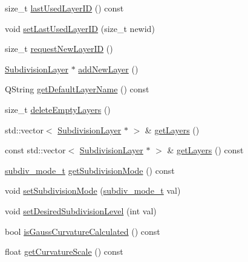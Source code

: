 \begin{DoxyCompactItemize}
\item 
size\+\_\+t \hyperlink{classShipCAD_1_1SubdivisionSurface_ac1efd2774e8a7e646468154ed5480f94}{last\+Used\+Layer\+ID} () const 
\item 
void \hyperlink{classShipCAD_1_1SubdivisionSurface_aa72a8cf7c5bddaaf24ec41ad3480fe70}{set\+Last\+Used\+Layer\+ID} (size\+\_\+t newid)
\item 
size\+\_\+t \hyperlink{classShipCAD_1_1SubdivisionSurface_a3af3a30b53d867b2b25f9ac9290a264a}{request\+New\+Layer\+ID} ()
\item 
\hyperlink{classShipCAD_1_1SubdivisionLayer}{Subdivision\+Layer} $\ast$ \hyperlink{classShipCAD_1_1SubdivisionSurface_a5bf8f452664e17dae636d4b66a66eba9}{add\+New\+Layer} ()
\item 
Q\+String \hyperlink{classShipCAD_1_1SubdivisionSurface_abcf2b65e206516f95021ad4f3f3aaf25}{get\+Default\+Layer\+Name} () const 
\item 
size\+\_\+t \hyperlink{classShipCAD_1_1SubdivisionSurface_ae250dca383fa87327a0ea85c933af0d2}{delete\+Empty\+Layers} ()
\item 
std\+::vector$<$ \hyperlink{classShipCAD_1_1SubdivisionLayer}{Subdivision\+Layer} $\ast$ $>$ \& \hyperlink{classShipCAD_1_1SubdivisionSurface_a2edced5f3a542be51b857e92ecfbf63e}{get\+Layers} ()
\item 
const std\+::vector$<$ \hyperlink{classShipCAD_1_1SubdivisionLayer}{Subdivision\+Layer} $\ast$ $>$ \& \hyperlink{classShipCAD_1_1SubdivisionSurface_a2b5d74a0d4ff35c80a88e3bb2a256818}{get\+Layers} () const 
\item 
\hyperlink{namespaceShipCAD_a4a9d1acfd6a2e1e9078a5dcc36f0c817}{subdiv\+\_\+mode\+\_\+t} \hyperlink{classShipCAD_1_1SubdivisionSurface_ab85cd3c9b75664e3d8dfa1bd9bfa6e9a}{get\+Subdivision\+Mode} () const 
\item 
void \hyperlink{classShipCAD_1_1SubdivisionSurface_a048dce00d2ff87aa5b31319ea41f565a}{set\+Subdivision\+Mode} (\hyperlink{namespaceShipCAD_a4a9d1acfd6a2e1e9078a5dcc36f0c817}{subdiv\+\_\+mode\+\_\+t} val)
\item 
void \hyperlink{classShipCAD_1_1SubdivisionSurface_a53271216c1be89154c08d2b2841f9a60}{set\+Desired\+Subdivision\+Level} (int val)
\item 
bool \hyperlink{classShipCAD_1_1SubdivisionSurface_ac7aaeee8df7f89aeb59f1e3f8514b872}{is\+Gauss\+Curvature\+Calculated} () const 
\item 
float \hyperlink{classShipCAD_1_1SubdivisionSurface_a71607715751aa734da85315f697c29ce}{get\+Curvature\+Scale} () const 
\item 

\end{DoxyCompactItemize}

